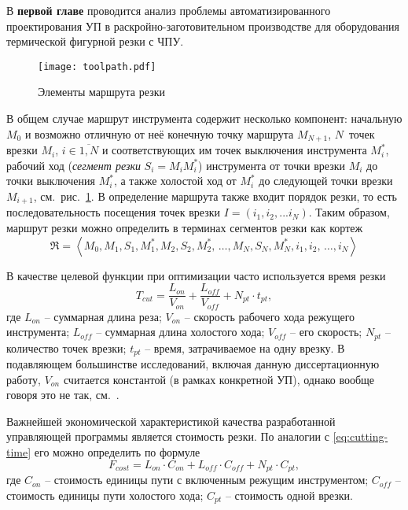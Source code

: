 
В {\bf первой главе}
проводится анализ проблемы автоматизированного проектирования УП
в раскройно-заготовительном производстве для оборудования термической фигурной резки с ЧПУ.

\begin{figure}
  \centering
  \texttt{[image: toolpath.pdf]}
  \caption{Элементы маршрута резки}
  \label{fig:toolpath}
\end{figure}

В общем случае маршрут инструмента содержит несколько компонент:
начальную $M_0$
и возможно отличную от неё конечную точку маршрута $M_{N+1}$,
$N$~точек врезки $M_i$, $i \in \overline{1, N}$
и соответствующих им точек выключения инструмента
$M_i^*$,
рабочий ход
({\it сегмент резки}
$S_i=M_i M_i^*$)
инструмента от точки врезки $M_i$
до точки выключения $M_i^*$,
а также холостой ход от $M_i^*$
до следующей точки врезки $M_{i+1}$,
см.~рис.~\ref{fig:toolpath}.
В определение маршрута также входит
порядок резки,
то есть последовательность посещения точек врезки
$I = (i_1, i_2, ... i_N)$.
Таким образом,
маршрут резки можно определить
в терминах сегментов резки как кортеж
\begin{equation}
  \mathfrak{R} = \left<
    M_0, M_1, S_1, M_1^*, M_2, S_2, M_2^*, \,\dots, M_N, S_N, M_N^*,
    i_1, i_2, \,\dots, i_N
  \right>
  \label{eq:route:tuple}
\end{equation}

В качестве целевой функции при оптимизации часто используется время резки
\begin{equation}
  T_{cut} = \frac{L_{on}}{V_{on}} + \frac{L_{off}}{V_{off}} +N_{pt} \cdot t_{pt}
  ,
  \label{eq:cutting-time}
\end{equation}
где
$L_{on}$ -- суммарная длина реза;
$V_{on}$ -- скорость рабочего хода режущего инструмента;
$L_{off}$ -- суммарная длина холостого хода;
$V_{off}$ -- его скорость;
$N_{pt}$ -- количество точек врезки;
$t_{pt}$ -- время, затрачиваемое на одну врезку.
В подавляющем большинстве исследований,
включая данную диссертационную работу,
$V_{on}$ считается константой
(в рамках конкретной УП),
однако вообще говоря это не так,
см.~\cite{Obuhovo}.

Важнейшей экономической характеристикой качества
разработанной управляющей программы является стоимость
резки.
По аналогии с \eqref{eq:cutting-time}
его можно определить по формуле
\begin{equation}
  F_{cost}=
  L_{on} \cdot C_{on} +
  L_{off} \cdot C_{off} +
  N_{pt} \cdot C_{pt}
  ,
  \label{eq:cutting-cost}
\end{equation}
где
$C_{on}$ -- стоимость единицы пути с включенным режущим инструментом;
$C_{off}$ -- стоимость единицы пути холостого хода;
$C_{pt}$ -- стоимость одной врезки.

